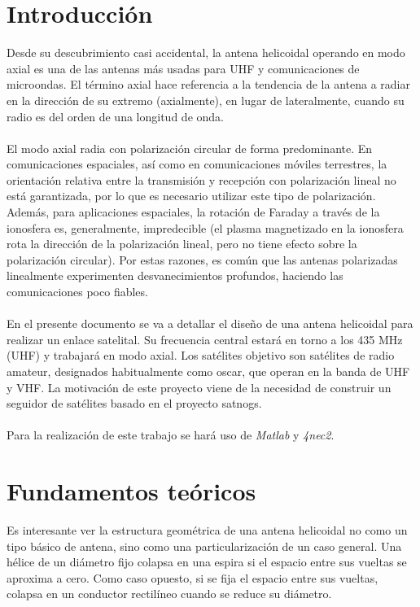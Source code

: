 \documentclass[12pt]{article}
\begin{document}
\tableofcontents
\pagebreak


\section{Introducción}
Desde su descubrimiento casi accidental, la antena helicoidal operando en modo axial es una de las antenas más usadas para UHF y comunicaciones de microondas. El término axial hace referencia a la tendencia de la antena a radiar en la dirección de su extremo (axialmente), en lugar de lateralmente, cuando su radio es del orden de una longitud de onda.\\\\
El modo axial radia con polarización circular de forma predominante. En comunicaciones espaciales, así como en comunicaciones móviles terrestres, la orientación relativa entre la transmisión y recepción con polarización lineal no está garantizada, por lo que es necesario utilizar este tipo de polarización. Además, para aplicaciones espaciales, la rotación de Faraday a través de la ionosfera es, generalmente, impredecible (el plasma magnetizado en la ionosfera rota la dirección de la polarización lineal, pero no tiene efecto sobre la polarización circular). Por estas razones, es común que las antenas polarizadas linealmente experimenten desvanecimientos profundos, haciendo las comunicaciones poco fiables.\\\\
En el presente documento se va a detallar el diseño de una antena helicoidal para realizar un enlace satelital. Su frecuencia central estará en torno a los 435 MHz (UHF) y trabajará en modo axial. Los satélites objetivo son satélites de radio amateur, designados habitualmente como \gls{oscar}, que operan en la banda de UHF y VHF. La motivación de este proyecto viene de la necesidad de construir un seguidor de satélites basado en el proyecto \gls{satnogs}.\\\\
Para la realización de este trabajo se hará uso de \textit{Matlab} y \textit{4nec2}.

\newpage
\section{Fundamentos teóricos}
Es interesante ver la estructura geométrica de una antena helicoidal no como un tipo básico de antena, sino como una particularización de un caso general. Una hélice de un diámetro fijo colapsa en una espira si el espacio entre sus vueltas se aproxima a cero. Como caso opuesto, si se fija el espacio entre sus vueltas, colapsa en un conductor rectilíneo cuando se reduce su diámetro.
\end{document}
